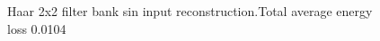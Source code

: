 \documentclass{beamer}
\begin{document}
\begin{frame}
\begin{itemize}
\begin{figure}[ht!]
\begin{minipage}{0.45\textwidth}
                      \caption{Haar 2x2 filter bank sin input reconstruction.Total average energy loss 0.0104}
                  \end{minipage}
              \end{figure}
    \end{itemize}
\end{frame}
\end{document}
